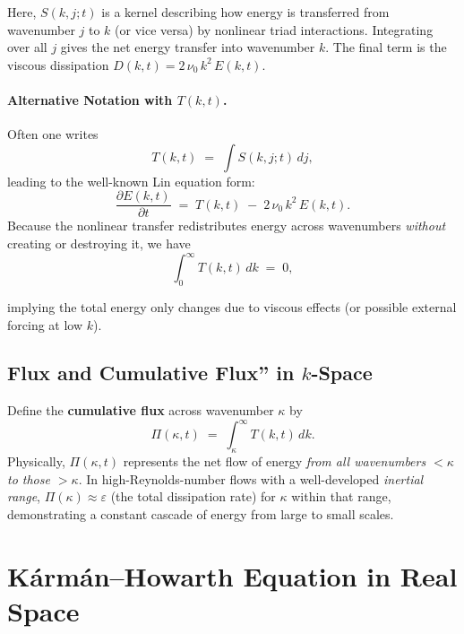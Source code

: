 \documentclass[12pt,a4paper]{article}
\begin{document}
Here, \(S(k,j;t)\) is a kernel describing how energy is transferred from wavenumber \(j\) to \(k\) (or vice versa) by nonlinear triad interactions.  Integrating over all \(j\) gives the net energy transfer into wavenumber \(k\).  The final term is the viscous dissipation \(D(k,t) = 2\,\nu_0\,k^2\,E(k,t)\).

\paragraph{Alternative Notation with \boldmath$T(k,t)$.}
Often one writes 
\begin{equation}
T(k,t)
\;=\;
\int S(k,j;t)\,d j,
\end{equation}
leading to the well-known Lin equation form:
\begin{equation}
  \frac{\partial E(k,t)}{\partial t}
  \;=\;
  T(k,t)
  \;-\;
  2\,\nu_0\,k^2\,E(k,t).
\label{eq:LinEq_simple}
\end{equation}
Because the nonlinear transfer redistributes energy across wave\-numbers \emph{without} creating or destroying it, we have
\begin{equation}
\int_{0}^{\infty} T(k,t)\,dk \;=\;0,
\end{equation}

implying the total energy only changes due to viscous effects (or possible external forcing at low \(k\)).

\subsection{Flux and Cumulative Flux'' in \boldmath$k$-Space}

Define the \textbf{cumulative flux} across wavenumber \(\kappa\) by
\begin{equation}
\Pi(\kappa,t)
\;=\;
\int_{\kappa}^{\infty} T(k,t)\,dk.
\end{equation}
Physically, \(\Pi(\kappa,t)\) represents the net flow of energy \emph{from all wavenumbers \(< \kappa\) to those \(> \kappa\)}.  In high-Reynolds-number flows with a well-developed \emph{inertial range}, \(\Pi(\kappa)\approx \varepsilon\) (the total dissipation rate) for \(\kappa\) within that range, demonstrating a constant cascade of energy from large to small scales.

\section{Kármán–Howarth Equation in Real Space}
\end{document}
